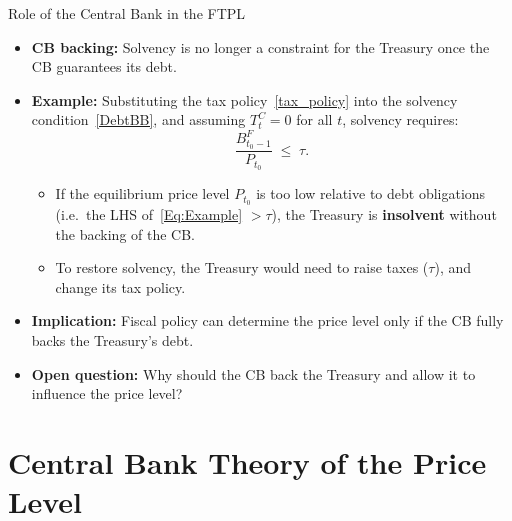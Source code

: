 \documentclass[11pt,aspectratio=169]{beamer}
\begin{document}
\begin{frame}{Role of the Central Bank in the FTPL}

\begin{itemize}

  \item \textbf{CB backing:}  
  Solvency is no longer a constraint for the Treasury once the CB guarantees its debt.

  \item \textbf{Example:}  
  Substituting the tax policy~\eqref{tax_policy} into the solvency condition~\eqref{DebtBB},  
  and assuming $T_t^{C} = 0$ for all $t$, solvency requires:
  \begin{equation}
    \frac{B^{F}_{t_0-1}}{P_{t_0}} \;\leq\; \tau.
    \label{Eq:Example}
  \end{equation}

  \begin{itemize}
    \item If the equilibrium price level $P_{t_0}$ is too low relative to debt obligations  
    (i.e.\ the LHS of~\eqref{Eq:Example} $> \tau$), the Treasury is \textbf{insolvent} without the backing of the CB.
    \item To restore solvency, the Treasury would need to raise taxes ($\tau$), and change its tax policy.
  \end{itemize}

  \item \textbf{Implication:}  
  Fiscal policy can determine the price level only if the CB fully backs the Treasury’s debt.

  \item \textbf{Open question:}  
  Why should the CB back the Treasury and allow it to influence the price level?

\end{itemize}
\end{frame}


\section{Central Bank Theory of the Price Level}
\end{document}
